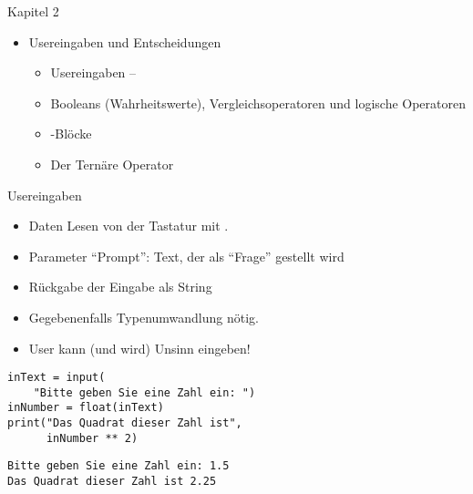 
\begin{frame}{Kapitel 2}
%
\begin{itemize}
\item  Usereingaben und Entscheidungen
	\begin{itemize}
	\item Usereingaben -- 
	\item Booleans (Wahrheitswerte), Vergleichsoperatoren und logische Operatoren
	\item {}-Blöcke
	\item Der Ternäre Operator
	\end{itemize}
\end{itemize}
%
\end{frame}


\begin{frame}[fragile]{Usereingaben}
%
\begin{itemize}
\item Daten Lesen von der Tastatur mit .
\item Parameter \enquote{Prompt}: Text, der als \enquote{Frage} gestellt wird
\item Rückgabe der Eingabe als String
\item Gegebenenfalls Typenumwandlung nötig.
\item User kann (und wird) Unsinn eingeben!
\end{itemize}
%
\vspace{-10pt}
\begin{minipage}[t]{.49\linewidth}
\phantom{x}
\begin{codebox}
\begin{verbatim}
inText = input(
    "Bitte geben Sie eine Zahl ein: ")
inNumber = float(inText)
print("Das Quadrat dieser Zahl ist",
      inNumber ** 2)
\end{verbatim}
\end{codebox}
\end{minipage}
%
\begin{minipage}[t]{.49\linewidth}
\phantom{x}
\begin{cmdbox}
\begin{verbatim}
Bitte geben Sie eine Zahl ein: 1.5
Das Quadrat dieser Zahl ist 2.25
\end{verbatim}
\end{cmdbox}
\end{minipage}
%
\end{frame}

